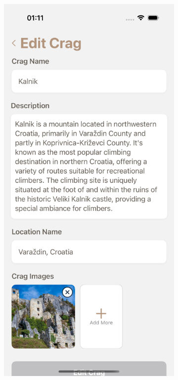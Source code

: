\begin{figure}[H]
    \centering
    \begin{subfigure}[b]{0.36\textwidth}
        \centering
        \includegraphics[width=\textwidth]{images/implementacija/editing-options/edit-crag.png}

\end{subfigure}
\end{figure}
